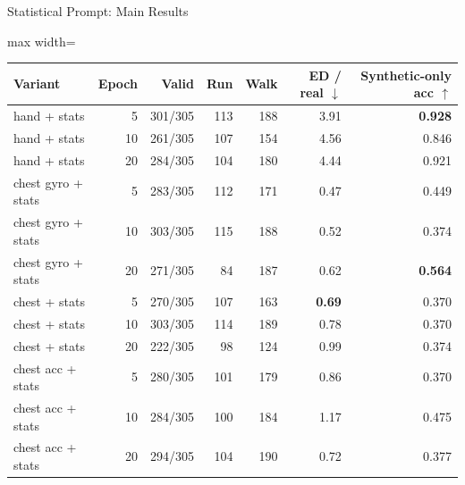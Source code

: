 \documentclass[aspectratio=169,11pt]{ctexbeamer}
\newcommand{\up}{\(\uparrow\)}
\newcommand{\down}{\(\downarrow\)}
\newcommand{\best}[1]{\textcolor{goodgreen}{\textbf{#1}}}
\begin{document}
\begin{frame}{Statistical Prompt: Main Results}
\small
\begin{adjustbox}{max width=\textwidth}
\begin{tabular}{lrrrrrr}
\toprule
Variant & Epoch & Valid & Run & Walk & ED / real \down & Synthetic-only acc \up \\
\midrule
hand + stats & 5 & 301/305 & 113 & 188 & 3.91 & \best{0.928} \\
hand + stats & 10 & 261/305 & 107 & 154 & 4.56 & 0.846 \\
hand + stats & 20 & 284/305 & 104 & 180 & 4.44 & 0.921 \\
chest gyro + stats & 5 & 283/305 & 112 & 171 & 0.47 & 0.449 \\
chest gyro + stats & 10 & 303/305 & 115 & 188 & 0.52 & 0.374 \\
chest gyro + stats & 20 & 271/305 & 84 & 187 & 0.62 & \best{0.564} \\
chest + stats & 5 & 270/305 & 107 & 163 & \best{0.69} & 0.370 \\
chest + stats & 10 & 303/305 & 114 & 189 & 0.78 & 0.370 \\
chest + stats & 20 & 222/305 & 98 & 124 & 0.99 & 0.374 \\
chest acc + stats & 5 & 280/305 & 101 & 179 & 0.86 & 0.370 \\
chest acc + stats & 10 & 284/305 & 100 & 184 & 1.17 & 0.475 \\
chest acc + stats & 20 & 294/305 & 104 & 190 & 0.72 & 0.377 \\
\bottomrule
\end{tabular}
\end{adjustbox}
\end{frame}
\end{document}
